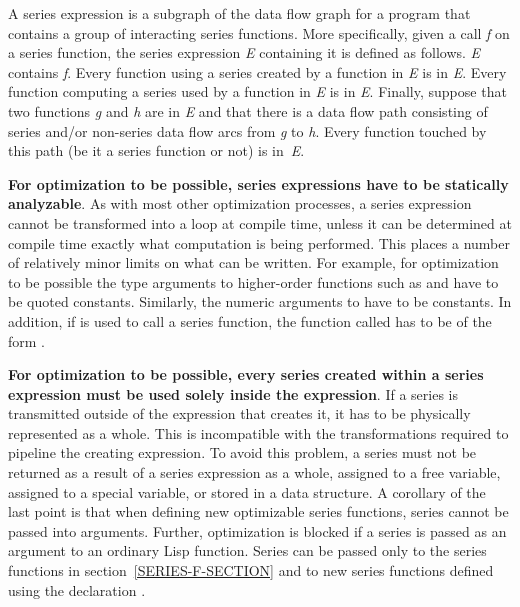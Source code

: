 A series expression is a subgraph of the data flow graph for a program that
contains a group of interacting series functions.  More specifically, given
a call {\it f} on a series function, the series expression {\it E} containing it is
defined as follows.  {\it E} contains {\it f}.  Every function using a series
created by a function in {\it E} is in {\it E}.  Every function computing a series
used by a function in {\it E} is in {\it E}.  Finally, suppose that two functions
{\it g} and {\it h} are in {\it E} and that there is a data flow path consisting of
series and/or non-series data flow arcs from {\it g} to {\it h}.  Every function
touched by this path (be it a series function or not) is in~{\it E}.

{\bf For optimization to be possible, series expressions have to be
statically analyzable}.  As with most other optimization processes, a
series expression cannot be transformed into a loop at compile time, unless
it can be determined at compile time exactly what computation is being
performed.  This places a number of relatively minor limits on what can be
written.  For example, for optimization to be possible the type arguments
to higher-order functions such as  and  have
to be quoted constants.  Similarly, the numeric arguments to 
have to be constants.  In addition, if  is used to call a
series function, the function called has to be of the
form .

{\bf For optimization to be possible, every series created within a series
expression must be used solely inside the expression}.  If a series is
transmitted outside of the expression that creates it, it has to be
physically represented as a whole.  This is incompatible with the
transformations required to pipeline the creating expression. To avoid this
problem, a series must not be returned as a result of a series expression
as a whole, assigned to a free variable, assigned to a special variable, or
stored in a data structure.  A corollary of the last point is that when
defining new optimizable series functions, series cannot be passed into
 arguments.  Further, optimization is blocked if a series is
passed as an argument to an ordinary Lisp function.  Series can be
passed only to the series functions in section~\ref{SERIES-F-SECTION} and to new series
functions defined using the declaration .

